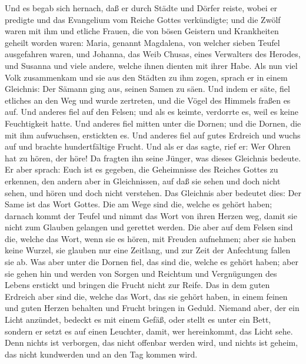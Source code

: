  Und es begab sich hernach, daß er durch Städte und Dörfer
reiste, wobei er predigte und das Evangelium vom Reiche Gottes
verkündigte; und die Zwölf waren mit ihm  und etliche
Frauen, die von bösen Geistern und Krankheiten geheilt worden waren:
Maria, genannt Magdalena, von welcher sieben Teufel ausgefahren waren,
 und Johanna, das Weib Chusas, eines Verwalters des
Herodes, und Susanna und viele andere, welche ihnen dienten mit ihrer
Habe.  Als nun viel Volk zusammenkam und sie aus den
Städten zu ihm zogen, sprach er in einem Gleichnis:  Der
Sämann ging aus, seinen Samen zu säen. Und indem er säte, fiel etliches
an den Weg und wurde zertreten, und die Vögel des Himmels fraßen es auf.
 Und anderes fiel auf den Felsen; und als es keimte,
verdorrte es, weil es keine Feuchtigkeit hatte.  Und
anderes fiel mitten unter die Dornen; und die Dornen, die mit ihm
aufwuchsen, erstickten es.  Und anderes fiel auf gutes
Erdreich und wuchs auf und brachte hundertfältige Frucht. Und als er das
sagte, rief er: Wer Ohren hat zu hören, der höre!  Da
fragten ihn seine Jünger, was dieses Gleichnis bedeute. 
Er aber sprach: Euch ist es gegeben, die Geheimnisse des Reiches Gottes
zu erkennen, den andern aber in Gleichnissen, auf daß sie sehen und doch
nicht sehen, und hören und doch nicht verstehen.  Das
Gleichnis aber bedeutet dies: Der Same ist das Wort Gottes.
 Die am Wege sind die, welche es gehört haben; darnach
kommt der Teufel und nimmt das Wort von ihren Herzen weg, damit sie
nicht zum Glauben gelangen und gerettet werden.  Die aber
auf dem Felsen sind die, welche das Wort, wenn sie es hören, mit Freuden
aufnehmen; aber sie haben keine Wurzel, sie glauben nur eine Zeitlang,
und zur Zeit der Anfechtung fallen sie ab.  Was aber
unter die Dornen fiel, das sind die, welche es gehört haben; aber sie
gehen hin und werden von Sorgen und Reichtum und Vergnügungen des Lebens
erstickt und bringen die Frucht nicht zur Reife.  Das in
dem guten Erdreich aber sind die, welche das Wort, das sie gehört haben,
in einem feinen und guten Herzen behalten und Frucht bringen in Geduld.
 Niemand aber, der ein Licht anzündet, bedeckt es mit
einem Gefäß, oder stellt es unter ein Bett, sondern er setzt es auf
einen Leuchter, damit, wer hereinkommt, das Licht sehe. 
Denn nichts ist verborgen, das nicht offenbar werden wird, und nichts
ist geheim, das nicht kundwerden und an den Tag kommen wird.
